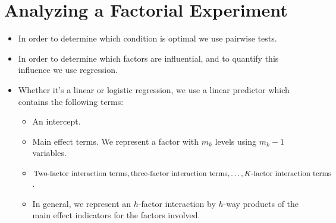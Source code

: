 \section{Analyzing a Factorial Experiment}
\begin{itemize}
      \item In order to determine which condition is optimal we use pairwise tests.
      \item In order to determine which factors are influential, and to quantify this influence we use regression.
      \item Whether it's a linear or logistic regression, we use a linear predictor which contains the following terms:
            \begin{itemize}
                  \item An intercept.
                  \item Main effect terms. We represent a factor with $ m_k $ levels using $ m_k-1 $ variables.
                  \item $ \text{Two-factor interaction terms}, \text{three-factor interaction terms},\ldots , \text{$ K $-factor interaction terms} $.
                  \item In general, we represent an $ h $-factor interaction by $ h $-way products of the main effect indicators for the factors involved.
            \end{itemize}
\end{itemize}
